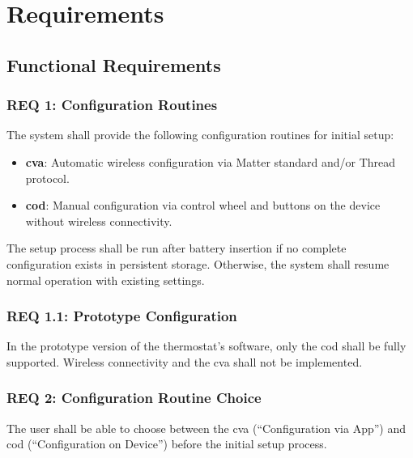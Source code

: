 %
%

\chapter{Requirements}
\label{chap:Requirements}

\section{Functional Requirements}
\label{sec:Functional Requirements}

\subsection*{REQ 1: Configuration Routines}
\label{subsec:REQ 1: Configuration Routines}
The system shall provide the following configuration routines for initial setup:
\begin{itemize}
    \item \textbf{\ac{cva}}: Automatic wireless configuration via Matter standard and/or Thread protocol.
    \item \textbf{\ac{cod}}: Manual configuration via control wheel and buttons on the device without wireless connectivity.
\end{itemize}
The setup process shall be run after battery insertion if no complete configuration exists in persistent storage. Otherwise, the system shall resume normal operation with existing settings.

\subsection*{REQ 1.1: Prototype Configuration}
\label{subsec:REQ 1.1: Prototype Configuration}
In the prototype version of the thermostat's software, only the \acs{cod} shall be fully supported. Wireless connectivity and the \acs{cva} shall not be implemented.

\subsection*{REQ 2: Configuration Routine Choice}
\label{subsec:REQ 2: Configuration Routine Choice}
The user shall be able to choose between the \acs{cva} (``Configuration via App'') and \acs{cod} (``Configuration on Device'') before the initial setup process.

